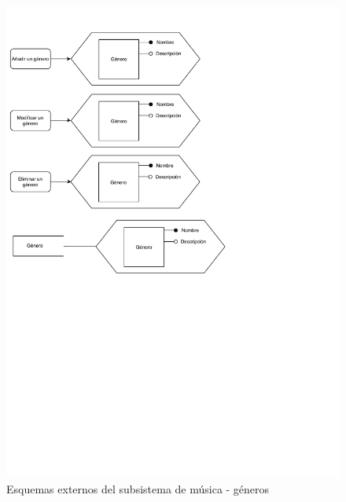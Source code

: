 \begin{figure}[H]
  \caption{Esquemas externos del subsistema de música - géneros}
  \centering
  \includegraphics{diagramas/musica-externo-genero.pdf}
\end{figure}

